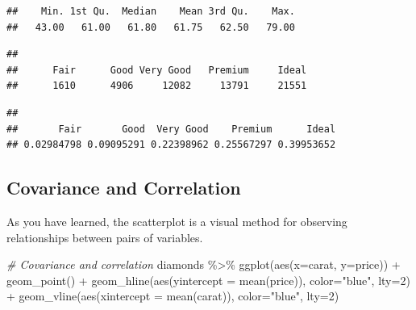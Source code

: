 \documentclass[
]{book}
\newenvironment{Shaded}{\begin{snugshade}}{\end{snugshade}}
\newcommand{\AttributeTok}[1]{\textcolor[rgb]{0.77,0.63,0.00}{#1}}
\newcommand{\CommentTok}[1]{\textcolor[rgb]{0.56,0.35,0.01}{\textit{#1}}}
\newcommand{\DecValTok}[1]{\textcolor[rgb]{0.00,0.00,0.81}{#1}}
\newcommand{\FunctionTok}[1]{\textcolor[rgb]{0.00,0.00,0.00}{#1}}
\newcommand{\NormalTok}[1]{#1}
\newcommand{\SpecialCharTok}[1]{\textcolor[rgb]{0.00,0.00,0.00}{#1}}
\newcommand{\StringTok}[1]{\textcolor[rgb]{0.31,0.60,0.02}{#1}}
\begin{document}
\begin{verbatim}
##    Min. 1st Qu.  Median    Mean 3rd Qu.    Max. 
##   43.00   61.00   61.80   61.75   62.50   79.00
\end{verbatim}

\begin{Shaded}
\end{Shaded}

\begin{verbatim}
## 
##      Fair      Good Very Good   Premium     Ideal 
##      1610      4906     12082     13791     21551
\end{verbatim}

\begin{Shaded}
\end{Shaded}

\begin{verbatim}
## 
##       Fair       Good  Very Good    Premium      Ideal 
## 0.02984798 0.09095291 0.22398962 0.25567297 0.39953652
\end{verbatim}

\hypertarget{covariance-and-correlation}{%
\subsection{Covariance and Correlation}\label{covariance-and-correlation}}

As you have learned, the scatterplot is a visual method for observing relationships between pairs of variables.

\begin{Shaded}
\begin{Highlighting}[]
\CommentTok{\# Covariance and correlation}
\NormalTok{diamonds }\SpecialCharTok{\%\textgreater{}\%}
  \FunctionTok{ggplot}\NormalTok{(}\FunctionTok{aes}\NormalTok{(}\AttributeTok{x=}\NormalTok{carat, }\AttributeTok{y=}\NormalTok{price)) }\SpecialCharTok{+}
  \FunctionTok{geom\_point}\NormalTok{() }\SpecialCharTok{+}
  \FunctionTok{geom\_hline}\NormalTok{(}\FunctionTok{aes}\NormalTok{(}\AttributeTok{yintercept =} \FunctionTok{mean}\NormalTok{(price)), }\AttributeTok{color=}\StringTok{"blue"}\NormalTok{, }\AttributeTok{lty=}\DecValTok{2}\NormalTok{) }\SpecialCharTok{+}
  \FunctionTok{geom\_vline}\NormalTok{(}\FunctionTok{aes}\NormalTok{(}\AttributeTok{xintercept =} \FunctionTok{mean}\NormalTok{(carat)), }\AttributeTok{color=}\StringTok{"blue"}\NormalTok{, }\AttributeTok{lty=}\DecValTok{2}\NormalTok{)}
\end{Highlighting}
\end{Shaded}
\end{document}
